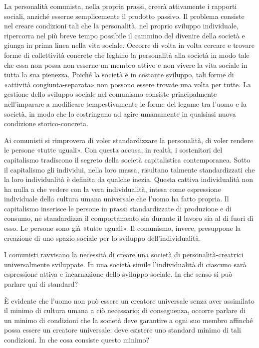 \documentclass[../main]{subfiles}
\begin{document}
La personalità comunista, nella propria prassi, creerà attivamente i rapporti sociali, anziché esserne semplicemente il prodotto passivo. Il problema consiste nel creare condizioni tali che la personalità, nel proprio sviluppo individuale, ripercorra nel più breve tempo possibile il cammino del divenire della società e giunga in prima linea nella vita sociale. Occorre di volta in volta cercare e trovare forme di collettività concrete che leghino la personalità alla società in modo tale che essa non possa non esserne un membro attivo e non vivere la vita sociale in tutta la sua pienezza. Poiché la società è in costante sviluppo, tali forme di «attività congiunta-separata» non possono essere trovate una volta per tutte. La gestione dello sviluppo sociale nel comunismo consiste principalmente nell'imparare a modificare tempestivamente le forme del legame tra l'uomo e la società, in modo che lo costringano ad agire umanamente in qualsiasi nuova condizione storico-concreta.

Ai comunisti si rimprovera di voler standardizzare la personalità, di voler rendere le persone «tutte uguali». Con questa accusa, in realtà, i sostenitori del capitalismo tradiscono il segreto della società capitalistica contemporanea. Sotto il capitalismo gli individui, nella loro massa, risultano talmente standardizzati che la loro individualità è definita da qualche inezia. Questa cattiva individualità non ha nulla a che vedere con la vera individualità, intesa come espressione individuale della cultura umana universale che l'uomo ha fatto propria. Il capitalismo inserisce le persone in prassi standardizzate di produzione e di consumo, ne standardizza il comportamento sia durante il lavoro sia al di fuori di esso. Le persone sono già «tutte uguali». Il comunismo, invece, presuppone la creazione di uno spazio sociale per lo sviluppo dell'individualità.

I comunisti ravvisano la necessità di creare una società di personalità-creatrici universalmente sviluppate. In una società simile l'individualità di ciascuno sarà espressione attiva e incarnazione dello sviluppo sociale. In che senso si può parlare qui di standard?

È evidente che l'uomo non può essere un creatore universale senza aver assimilato il minimo di cultura umana a ciò necessario; di conseguenza, occorre parlare di un minimo di condizioni che la società deve garantire a ogni suo membro affinché possa essere un creatore universale: deve esistere uno standard minimo di tali condizioni. In che cosa consiste questo minimo?
\end{document}
